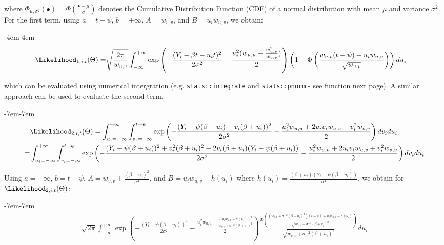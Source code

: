 \documentclass[12pt]{article}
\begin{document}
where \(\Phi_{\mu,\sigma^2}(\bullet)= \Phi(\frac{\bullet-\mu}{\sigma})\) denotes
the Cumulative Distribution Function (CDF) of a normal distribution
with mean \(\mu\) and variance \(\sigma^2\). For the first term, using
\(a=t-\psi\), \(b=+\infty\), \(A=w_{v,v}\), and \(B = u_i w_{u,v}\),
we obtain:
\begin{adjustwidth}{-4em}{-4em}
\begin{align*}
\Likelihood_{1,i,t}(\Theta) =&
\sqrt{\frac{2\pi}{w_{v,v}}} \int_{-\infty}^{+\infty} \exp\left(-\frac{(Y_i - \beta t - u_i t)^2}{2\sigma^2} - \frac{u_i^2 (w_{u,u} -  \frac{w^2_{u,v}}{w_{v,v}})}{2} \right)
                                             \left(1 - \Phi\left(\frac{w_{v,v} (t-\psi) + u_i w_{u,v}}{\sqrt{w_{v,v}}}\right)\right)du_i
\end{align*}
\end{adjustwidth}
which can be evaluated using numerical intergration
(e.g. \texttt{stats::integrate} and \texttt{stats::pnorm} - see function next
page). A similar approach can be used to evaluate the second term.
\begin{adjustwidth}{-7em}{-7em}
\begin{align*}
&\Likelihood_{2,i,t}(\Theta) = \int_{u_i=-\infty}^{+\infty}\int_{v_i=-\infty}^{t-\psi} \exp\left(-\frac{(Y_i - \psi (\beta + u_i) - v_i (\beta + u_i))^2}{2\sigma^2} - \frac{u_i^2 w_{u,u}+2u_i v_i w_{u,v}+v_i^2 w_{v,v}}{2}\right) dv_i du_i \\
=& \int_{u_i=-\infty}^{+\infty}\int_{v_i=-\infty}^{t-\psi} \exp\left(-\frac{(Y_i - \psi (\beta + u_i))^2 + v^2_i (\beta + u_i)^2 - 2 v_i (\beta + u_i) (Y_i - \psi (\beta + u_i))}{2\sigma^2} - \frac{u_i^2 w_{u,u}+2u_i v_i w_{u,v}+v_i^2 w_{v,v}}{2}\right) dv_i du_i
\end{align*}
\end{adjustwidth}
Using \(a=-\infty\), \(b=t-\psi\), \(A=w_{v,v}+\frac{(\beta+u_i)^2}{\sigma^2}\), and
\(B = u_i w_{u,v} - h(u_i)\) where
\(h(u_i)=\frac{(\beta+u_i)(Y_i-\psi(\beta+u_i))}{\sigma^2}\), we obtain for \(\Likelihood_{2,i,t}(\Theta)\):

\begin{adjustwidth}{-7em}{-7em}
\begin{align*}
\sqrt{2\pi} \int_{-\infty}^{+\infty} \exp\left(-\frac{(Y_i - \psi (\beta + u_i))^2}{2\sigma^2} - \frac{u_i^2 w_{u,u} -  \frac{(u_i w_{u,v}-h(u_i))^2}{w_{v,v}+\sigma^{-2}(\beta+u_i)^2}}{2} \right)
                                             \frac{\Phi\left( \frac{(w_{v,v}+\sigma^{-2}(\beta+u_i)^2) (t-\psi) + u_i w_{u,v} - h(u_i)}{\sqrt{w_{v,v}+\sigma^{-2}(\beta+u_i)^2}}\right)}{\sqrt{w_{v,v}+\sigma^{-2}(\beta+u_i)^2}} du_i
\end{align*}
\end{adjustwidth}
\end{document}
